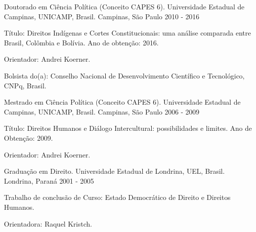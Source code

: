 \begin{cventries}
\cventry
{Doutorado em Ciência Política (Conceito CAPES 6).} %
{Universidade Estadual de Campinas, UNICAMP, Brasil.} %
{Campinas, São Paulo} %
{2010 - 2016} %
{
  \begin{cvitems} %
    \item Título: Direitos Indígenas e Cortes Constitucionais: uma análise comparada entre Brasil, Colômbia e Bolívia. Ano de obtenção: 2016.
    \item Orientador: Andrei Koerner.
    \item Bolsista do(a): Conselho Nacional de Desenvolvimento Científico e Tecnológico, CNPq, Brasil.
  \end{cvitems}
}

\cventry
{Mestrado em Ciência Política (Conceito CAPES 6).}
{Universidade Estadual de Campinas, UNICAMP, Brasil.}
{Campinas, São Paulo}
{2006 - 2009}
{
\begin{cvitems}
  \item Título: Direitos Humanos e Diálogo Intercultural: possibilidades e limites. Ano de Obtenção: 2009.
  \item Orientador: Andrei Koerner.
 \end{cvitems}
}

\cventry
{Graduação em Direito.}
{Universidade Estadual de Londrina, UEL, Brasil.}
{Londrina, Paraná}
{2001 - 2005}
{
\begin{cvitems}
  \item Trabalho de conclusão de Curso: Estado Democrático de Direito e Direitos Humanos.
  \item Orientadora: Raquel Kristch.
 \end{cvitems}
}

\end{cventries}
